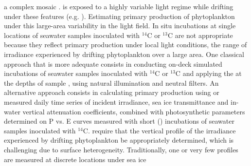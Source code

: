 \DIFdelbegin {}\DIFdelend \DIFaddbegin {}\DIFaddend a complex mosaic \DIFdelbegin {}\DIFdelend \DIFaddbegin {}\DIFaddend \citep{Nicolaus2013, Katlein2015, Katlein2016}. \DIFdelbegin {}\DIFdelend \DIFaddbegin {}\DIFaddend is exposed to a highly variable light regime while drifting under these features (e.g. \DIFdelbegin {}\DIFdelend \DIFaddbegin {}\DIFaddend ). Estimating primary production of phytoplankton under \DIFdelbegin {}\DIFdelend \DIFaddbegin {}\DIFaddend this large-area variability in the light field. In situ incubations at single locations of seawater samples inoculated with $^{14}$C or $^{13}$C are not appropriate because they reflect primary production under local light conditions, \DIFdelbegin {}\DIFdelend \DIFaddbegin {}\DIFaddend the range of irradiance experienced by drifting phytoplankton over a large area. One classical approach that is more adequate consists in conducting on-deck simulated \DIFdelbegin {}\DIFdelend \DIFaddbegin {}\DIFaddend incubations of seawater samples inoculated with $^{14}$C or $^{13}$C and applying the \DIFdelbegin {}\DIFdelend \DIFaddbegin {}\DIFaddend at the depths of sample \DIFdelbegin {}\DIFdelend \DIFaddbegin {}\DIFaddend , using natural illumination and neutral filters. An alternative approach consists in calculating primary production using \DIFdelbegin {}\DIFdelend \DIFaddbegin {}\DIFaddend or measured daily time series of incident irradiance, sea ice transmittance \DIFdelbegin \DIFdel{, }\DIFdelend and in-water vertical attenuation coefficients, combined with photosynthetic parameters determined on P vs. E curves measured with short (\DIFdelbegin {}\DIFdelend \DIFaddbegin {}\DIFaddend ) incubations of seawater samples inoculated with $^{14}$C. \DIFdelbegin {}\DIFdelend \DIFaddbegin {}\DIFaddend require that the vertical profile of the irradiance experienced by drifting phytoplankton be appropriately determined, which is challenging due to surface heterogeneity. Traditionally, one or very few \edz{} profiles are measured at discrete locations under sea ice \DIFdelbegin \DIFdel{\mbox{%
}}
